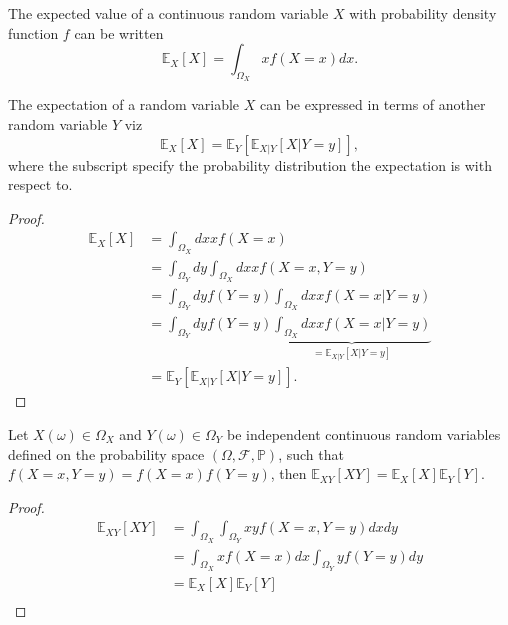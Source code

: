 \begin{theorem}
	\label{theorem:expectaion_continuous}
	The expected value of a continuous random variable $X$ with probability density function $f$ can be written 
	\begin{equation}
		\mathbb{E}_X[X]=\int_{\Omega_X}xf(X =x)dx.
	\end{equation}
\end{theorem}
\begin{theorem}
	\label{theorem:total_expectation}
	The expectation of a random variable $X$ can be expressed in terms of another random variable $Y$ viz
	\begin{equation}
			\mathbb{E}_X[X] = \mathbb{E}_Y[\mathbb{E}_{X|Y}[X|Y=y]],
	\end{equation}
	where the subscript specify the probability distribution the expectation is with respect to.
\end{theorem}
\begin{proof}
	\begin{equation}
		\begin{split}
			\mathbb{E}_X[X] &= \int_{\Omega_X} dx x f(X=x)\\
			& = \int_{\Omega_Y} dy\int_{\Omega_X}dx x f(X=x,Y=y)\\
			& =  \int_{\Omega_Y} dy f(Y=y) \int_{\Omega_X}dx x f(X=x|Y=y)\\
			& =  \int_{\Omega_Y} dy f(Y=y) \underbrace{\int_{\Omega_X}dx x f(X=x|Y=y)}_{= \mathbb{E}_{X|Y}[X|Y=y]}\\
			& = \mathbb{E}_Y[\mathbb{E}_{X|Y}[X|Y=y]].
		\end{split}
	\end{equation}
\end{proof}

\begin{theorem}
	\label{theorem:expectation_independent}
	Let $X(\omega)\in \Omega_X$ and $Y(\omega)\in \Omega_Y$ be independent continuous random variables defined on the probability space $(\Omega, \mathcal{F}, \mathbb{P})$, such that $f(X=x,Y=y)=f(X=x)f(Y=y)$, then $\mathbb{E}_{XY}[XY]=\mathbb{E}_X[X]\mathbb{E}_Y[Y]$.
\end{theorem}

\begin{proof}
	\begin{equation}
		\begin{split}
			\mathbb{E}_{XY}[XY] &= \int_{\Omega_X}\int_{\Omega_Y} x y f(X=x,Y=y)dxdy\\
			&= \int_{\Omega_X} x f(X=x)dx\int_{\Omega_Y}yf(Y=y)dy\\
			&= \mathbb{E}_X[X]\mathbb{E}_Y[Y]\\
		\end{split}
	\end{equation}
\end{proof}

